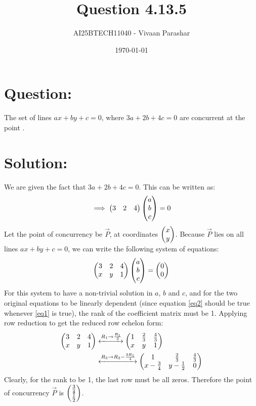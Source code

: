 \documentclass[a4paper, 12pt]{article}
\title{Question 4.13.5}
\author{AI25BTECH11040 - Vivaan Parashar}
\date{\today}
\begin{document}
\maketitle

\section{Question: }
The set of lines $ax + by + c = 0$, where $3a + 2b + 4c = 0$ are concurrent at the point \underline{\hspace{2cm}}.

\section{Solution: }
We are given the fact that $3a + 2b + 4c = 0$. This can be written as:
\begin{align}
    \implies \begin{pmatrix}3 & 2 & 4\end{pmatrix} \begin{pmatrix}a \\ b \\ c\end{pmatrix} = 0 \label{eq1}
\end{align}
Let the point of concurrency be $\vec{P}$, at coordinates $\begin{pmatrix}x \\ y\end{pmatrix}$. Because $\vec{P}$ lies on all lines $ax + by + c = 0$, we can write the following system of equations:
\begin{align}
    \begin{pmatrix}3 & 2 & 4 \\ x & y & 1\end{pmatrix} \begin{pmatrix}a \\ b \\ c\end{pmatrix} = \begin{pmatrix}0 \\ 0\end{pmatrix} \label{eq2}
\end{align}
For this system to have a non-trivial solution in $a$, $b$ and $c$, and for the two original equations to be linearly dependent (since equation \ref{eq2} should be true whenever \ref{eq1} is true), the rank of the coefficient matrix must be 1.
Applying row reduction to get the reduced row echelon form:
\begin{align}
    \begin{pmatrix}3 & 2 & 4 \\ x & y & 1\end{pmatrix} &\xleftrightarrow{R_1 \rightarrow \frac{R_1}{3}} \begin{pmatrix}1 & \frac{2}{3} & \frac{4}{3} \\ x & y & 1\end{pmatrix} \\
    &\xleftrightarrow{R_3 \rightarrow R_3 - \frac{3R_1}{4}} \begin{pmatrix}1 & \frac{2}{3} & \frac{4}{3} \\ x - \frac{3}{4} & y - \frac{1}{2} & 0\end{pmatrix}
\end{align}
Clearly, for the rank to be 1, the last row must be all zeros. Therefore the point of concurrency $\vec{P}$ is  $\begin{pmatrix}\frac{3}{4} \\ \frac{1}{2}\end{pmatrix}$.
\end{document}

